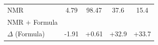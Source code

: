 \begingroup
\color{cInk}
\setlength{\tabcolsep}{6pt}
\renewcommand{\arraystretch}{1.18}
\begin{tabular}{@{}l S[table-format=+1.2] S[table-format=+2.2] S[table-format=+2.1] S[table-format=+2.1]@{}}
  \toprule
   & {} & {}
    & {} & {} \\
  \midrule
  NMR                & 4.79 & 98.47 & 37.6 & 15.4 \\
  NMR $+$ Formula    &  &  &  &  \\
  \addlinespace[2pt]
  $\Delta$ (Formula) & -1.91 & +0.61 & +32.9 & +33.7 \\
  \bottomrule
\end{tabular}
\endgroup
